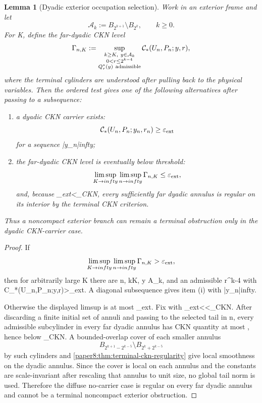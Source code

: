 \documentclass[11pt]{amsart}
\def\({}%
\def\){}%
\def\infty{infty}%
\theoremstyle{plain}
\newtheorem{lemma}[lemma]{Lemma}
\theoremstyle{definition}
\theoremstyle{remark}
\begin{document}
\begin{lemma}[Dyadic exterior occupation selection]
\label{paper8:lem:dyadic-exterior-occupation-selection}
Work in an exterior frame and let
\[
  \mathcal A_k:=B_{2^{k+1}}\setminus B_{2^k},
  \qquad k\ge0 .
\]
For \(K\), define the far-dyadic CKN level
\[
  \Gamma_{n,K}
  :=
  \sup_{\substack{k\ge K,\ y\in\mathcal A_k\\
  0<r\le 2^{k-4}\\
  Q_r^*(y)\ {\rm admissible}}}
  \mathcal C_*(U_n,P_n;y,r),
\]
where the terminal cylinders are understood after pulling back to the physical
variables.  Then the ordered test gives one of the following alternatives after
passing to a subsequence:
\begin{enumerate}[label=\textup{(\roman*)}]
\item a dyadic CKN carrier exists:
\[
  \mathcal C_*(U_n,P_n;y_{n},r_n)\ge\varepsilon_{\rm ext}
\]
for a sequence \(|y_n|\to\infty\);
\item the far-dyadic CKN level is eventually below threshold:
\[
  \limsup_{K\to\infty}\limsup_{n\to\infty}\Gamma_{n,K}
  \le \varepsilon_{\rm ext},
\]
and, because \(\varepsilon_{\rm ext}<\varepsilon_{\rm CKN}\), every
sufficiently far dyadic annulus is regular on its interior by the terminal CKN
criterion.
\end{enumerate}
Thus a noncompact exterior branch can remain a terminal obstruction only in the
dyadic CKN-carrier case.
\end{lemma}

\begin{proof}
If
\[
  \limsup_{K\to\infty}\limsup_{n\to\infty}\Gamma_{n,K}>
  \varepsilon_{\rm ext},
\]
then for arbitrarily large \(K\) there are \(n\), \(k\ge K\), \(y\in\mathcal
A_k\), and an admissible \(r^{k-4}\) with
\(\mathcal C_*(U_n,P_n;y,r)>\varepsilon_{\rm ext}\).  A diagonal subsequence
gives item \textup{(i)} with \(|y_n|\to\infty\).
\par
Otherwise the displayed limsup is at most \(\varepsilon_{\rm ext}\).  Fix
\(\eta\) with \(\varepsilon_{\rm ext}<\eta<\varepsilon_{\rm CKN}\).  After
discarding a finite initial set of annuli and passing to the selected tail in
\(n\), every admissible subcylinder in every far dyadic annulus has CKN
quantity at most \(\eta\), hence below \(\varepsilon_{\rm CKN}\).  A
bounded-overlap cover of each smaller annulus
\[
  B_{2^{k+1}-2^{k-5}}\setminus B_{2^k+2^{k-5}}
\]
by such cylinders and
\cref{paper8:thm:terminal-ckn-regularity} give local smoothness on the dyadic
annulus.  Since the cover is local on each annulus and the constants are
scale-invariant after rescaling that annulus to unit size, no global tail norm
is used.  Therefore the diffuse no-carrier case is regular on every far dyadic
annulus and cannot be a terminal noncompact exterior obstruction.
\end{proof}
\end{document}
